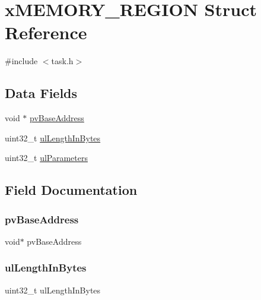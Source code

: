 \hypertarget{structx_m_e_m_o_r_y___r_e_g_i_o_n}{}\section{x\+M\+E\+M\+O\+R\+Y\+\_\+\+R\+E\+G\+I\+ON Struct Reference}
\label{structx_m_e_m_o_r_y___r_e_g_i_o_n}


{\ttfamily \#include $<$task.\+h$>$}

\subsection*{Data Fields}
\begin{DoxyCompactItemize}
\item 
void $\ast$ \mbox{\hyperlink{structx_m_e_m_o_r_y___r_e_g_i_o_n_a5c540d9e8ba79b50b9600f7225d41268}{pv\+Base\+Address}}
\item 
uint32\+\_\+t \mbox{\hyperlink{structx_m_e_m_o_r_y___r_e_g_i_o_n_a53924a8e3f7db81a7803b646573864c6}{ul\+Length\+In\+Bytes}}
\item 
uint32\+\_\+t \mbox{\hyperlink{structx_m_e_m_o_r_y___r_e_g_i_o_n_a8339f23aad15c6b829547a17f839f32c}{ul\+Parameters}}
\end{DoxyCompactItemize}


\subsection{Field Documentation}
\mbox{\label{structx_m_e_m_o_r_y___r_e_g_i_o_n_a5c540d9e8ba79b50b9600f7225d41268}} 
\subsubsection{\texorpdfstring{pvBaseAddress}{pvBaseAddress}}
{\footnotesize\ttfamily void$\ast$ pv\+Base\+Address}

\mbox{\label{structx_m_e_m_o_r_y___r_e_g_i_o_n_a53924a8e3f7db81a7803b646573864c6}} 
\subsubsection{\texorpdfstring{ulLengthInBytes}{ulLengthInBytes}}
{\footnotesize\ttfamily uint32\+\_\+t ul\+Length\+In\+Bytes}

